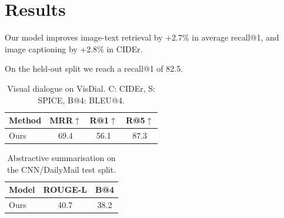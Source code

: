 \documentclass{article}
\begin{document}
\section{Results}

Our model improves image-text retrieval by +2.7\% in average recall@1, and
image captioning by +2.8\% in CIDEr.

On the held-out split we reach a recall@1 of 82.5.

\begin{table}
\begin{tabular}{lccc}
Method & MRR$\uparrow$ & R@1$\uparrow$ & R@5$\uparrow$ \\
\hline
Ours & 69.4 & 56.1 & 87.3 \\
\end{tabular}
\caption{Visual dialogue on VisDial. C: CIDEr, S: SPICE, B@4: BLEU@4.}
\end{table}

\begin{table}
\begin{tabular}{lcc}
Model & ROUGE-L & B@4 \\
\hline
Ours & 40.7 & 38.2 \\
\end{tabular}
\caption{Abstractive summarisation on the CNN/DailyMail test split.}
\end{table}
\end{document}
